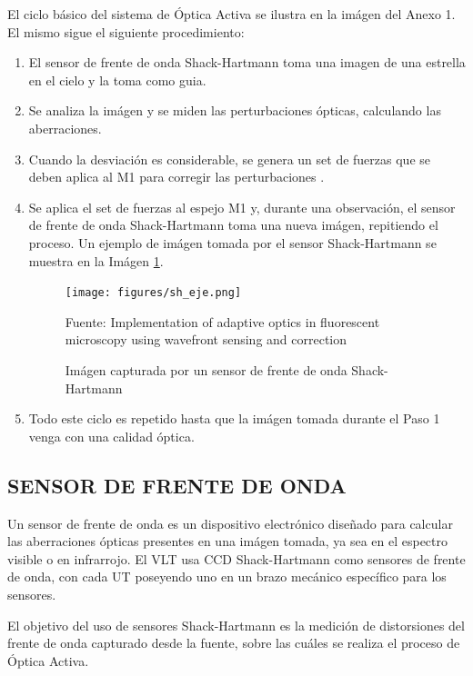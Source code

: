 El ciclo básico del sistema de Óptica Activa se ilustra en la imágen del Anexo 1. El mismo sigue el siguiente procedimiento:

\begin{enumerate}
    \item El sensor de frente de onda Shack-Hartmann toma una imagen de una estrella en el cielo y la toma como guia\cite{eso1998vlt}.

    \item Se analiza la imágen y se miden las perturbaciones ópticas, calculando las aberraciones\cite{wilson1987active}.

    \item Cuando la desviación es considerable, se genera un set de fuerzas que se deben aplica al M1 para corregir las perturbaciones \cite{wilson1987active}.

    \item Se aplica el set de fuerzas al espejo M1 y, durante una observación, el sensor de frente de onda Shack-Hartmann toma una nueva imágen, repitiendo el proceso\cite{wilson1987active}. Un ejemplo de imágen tomada por el sensor Shack-Hartmann se muestra en la Imágen \ref{fig:sh}.

    \begin{figure}[h]
    \centering
    \texttt{[image: figures/sh\_eje.png]}
    \caption{\label{fig:sh} Imágen capturada por un sensor de frente de onda Shack-Hartmann} Fuente: Implementation of adaptive optics in fluorescent microscopy using wavefront sensing and correction\cite{azucena2010ao}
    \end{figure}

     \item Todo este ciclo es repetido hasta que la imágen tomada durante el Paso 1 venga con una calidad óptica\cite{wilson1987active}.

\end{enumerate}

\subsection{SENSOR DE FRENTE DE ONDA}
Un sensor de frente de onda es un dispositivo electrónico diseñado para calcular las aberraciones ópticas presentes en una imágen tomada, ya sea en el espectro visible o en infrarrojo. El VLT usa CCD Shack-Hartmann como sensores de frente de onda, con cada UT poseyendo uno en un brazo mecánico específico para los sensores.\cite{eso1998vlt}

El objetivo del uso de sensores Shack-Hartmann es la medición de distorsiones del frente de onda capturado desde la fuente, sobre las cuáles se realiza el proceso de Óptica Activa.\cite{eso1998vlt}

